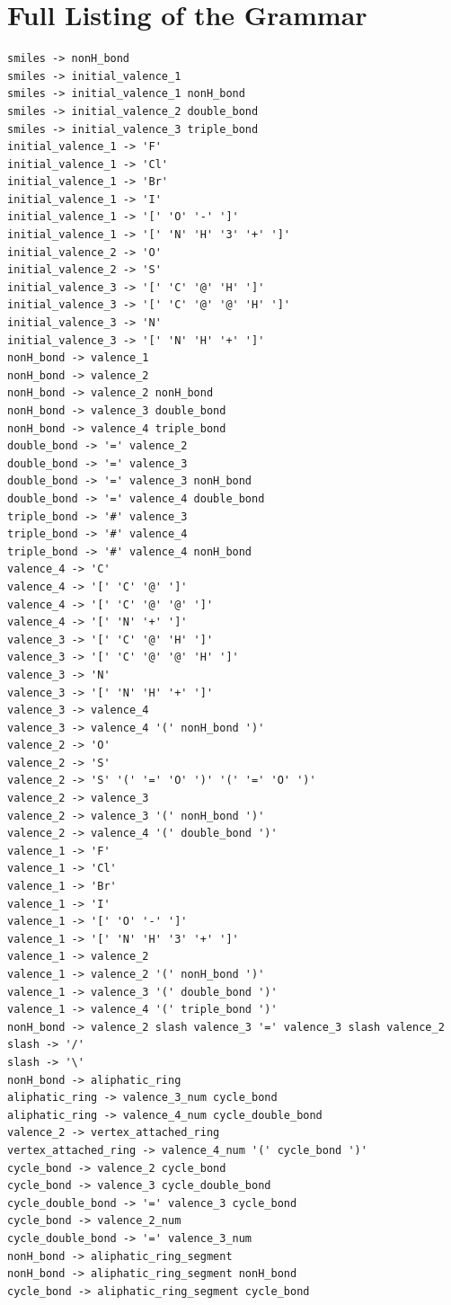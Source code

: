 \documentclass[11pt]{article}
\begin{document}
\section{Full Listing of the Grammar}\label{app:grammar}
\tiny
\begin{verbatim}
smiles -> nonH_bond
smiles -> initial_valence_1
smiles -> initial_valence_1 nonH_bond
smiles -> initial_valence_2 double_bond
smiles -> initial_valence_3 triple_bond
initial_valence_1 -> 'F'
initial_valence_1 -> 'Cl'
initial_valence_1 -> 'Br'
initial_valence_1 -> 'I'
initial_valence_1 -> '[' 'O' '-' ']'
initial_valence_1 -> '[' 'N' 'H' '3' '+' ']'
initial_valence_2 -> 'O'
initial_valence_2 -> 'S'
initial_valence_3 -> '[' 'C' '@' 'H' ']'
initial_valence_3 -> '[' 'C' '@' '@' 'H' ']'
initial_valence_3 -> 'N'
initial_valence_3 -> '[' 'N' 'H' '+' ']'
nonH_bond -> valence_1
nonH_bond -> valence_2
nonH_bond -> valence_2 nonH_bond
nonH_bond -> valence_3 double_bond
nonH_bond -> valence_4 triple_bond
double_bond -> '=' valence_2
double_bond -> '=' valence_3
double_bond -> '=' valence_3 nonH_bond
double_bond -> '=' valence_4 double_bond
triple_bond -> '#' valence_3
triple_bond -> '#' valence_4
triple_bond -> '#' valence_4 nonH_bond
valence_4 -> 'C'
valence_4 -> '[' 'C' '@' ']'
valence_4 -> '[' 'C' '@' '@' ']'
valence_4 -> '[' 'N' '+' ']'
valence_3 -> '[' 'C' '@' 'H' ']'
valence_3 -> '[' 'C' '@' '@' 'H' ']'
valence_3 -> 'N'
valence_3 -> '[' 'N' 'H' '+' ']'
valence_3 -> valence_4
valence_3 -> valence_4 '(' nonH_bond ')'
valence_2 -> 'O'
valence_2 -> 'S'
valence_2 -> 'S' '(' '=' 'O' ')' '(' '=' 'O' ')'
valence_2 -> valence_3
valence_2 -> valence_3 '(' nonH_bond ')'
valence_2 -> valence_4 '(' double_bond ')'
valence_1 -> 'F'
valence_1 -> 'Cl'
valence_1 -> 'Br'
valence_1 -> 'I'
valence_1 -> '[' 'O' '-' ']'
valence_1 -> '[' 'N' 'H' '3' '+' ']'
valence_1 -> valence_2
valence_1 -> valence_2 '(' nonH_bond ')'
valence_1 -> valence_3 '(' double_bond ')'
valence_1 -> valence_4 '(' triple_bond ')'
nonH_bond -> valence_2 slash valence_3 '=' valence_3 slash valence_2
slash -> '/'
slash -> '\'
nonH_bond -> aliphatic_ring
aliphatic_ring -> valence_3_num cycle_bond
aliphatic_ring -> valence_4_num cycle_double_bond
valence_2 -> vertex_attached_ring
vertex_attached_ring -> valence_4_num '(' cycle_bond ')'
cycle_bond -> valence_2 cycle_bond
cycle_bond -> valence_3 cycle_double_bond
cycle_double_bond -> '=' valence_3 cycle_bond
cycle_bond -> valence_2_num
cycle_double_bond -> '=' valence_3_num
nonH_bond -> aliphatic_ring_segment
nonH_bond -> aliphatic_ring_segment nonH_bond
cycle_bond -> aliphatic_ring_segment cycle_bond

\end{verbatim}
\end{document}
